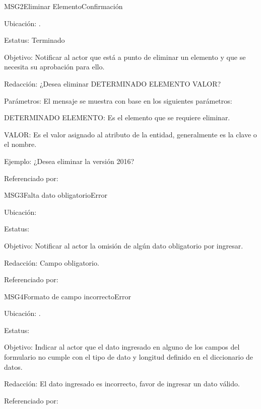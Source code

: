 \begin{mensaje}{MSG2}{Eliminar Elemento}{Confirmación}
	\item[Ubicación:] \msjEmergente.
	\item[Estatus:] Terminado
	\item[Objetivo:] Notificar al actor que está a punto de eliminar un elemento y que se necesita su aprobación para ello.
	\item[Redacción:] ¿Desea eliminar DETERMINADO ELEMENTO VALOR?
	\item[Parámetros:] El mensaje se muestra con base en los siguientes parámetros:
	\begin{Citemize} 
		\item DETERMINADO ELEMENTO: Es el elemento que se requiere eliminar.
		\item VALOR: Es el valor asignado al atributo de la entidad, generalmente es la clave o el nombre.
	\end{Citemize}
	\item[Ejemplo:] ¿Desea eliminar la versión 2016?
	\item[Referenciado por:] 
\end{mensaje}


\begin{mensaje}{MSG3}{Falta dato obligatorio}{Error}
	\item[Ubicación:] \msjCampo
	\item[Estatus:] %
	\item[Objetivo:] Notificar al actor la omisión de algún dato obligatorio por ingresar.
	\item[Redacción:] Campo obligatorio.
	\item[Referenciado por:] 
\end{mensaje}

\begin{mensaje}{MSG4}{Formato de campo incorrecto}{Error}
	\item[Ubicación:] \msjCampo.
	\item[Estatus:] %
	\item[Objetivo:] Indicar al actor que el dato ingresado en alguno de los campos del formulario no cumple con el tipo de dato y longitud definido en el diccionario de datos.
	\item[Redacción:] El dato ingresado es incorrecto, favor de ingresar un dato válido.
	\item[Referenciado por:]
\end{mensaje}


